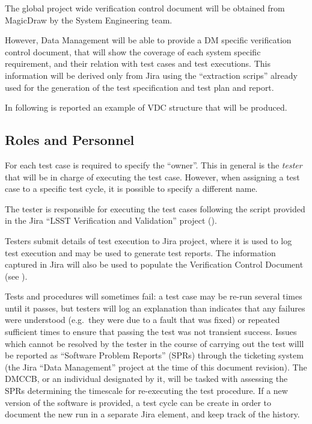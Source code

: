 The global project wide verification control document will be obtained from MagicDraw by the System Engineering team.

However, Data Management will be able to provide a DM specific verification control document, that will show the coverage of each system specific requirement, and their relation with test cases and test executions.
This information will be derived only from Jira using the ``extraction scrips'' already used for the generation of the test specification and test plan and report.

In following  is reported an example of VDC structure that will be produced.



\subsection{Roles and Personnel}
\label{sect:roles}


For each test case is required to specify the ``owner''. 
This in general is the \emph{tester} that will be in charge of executing the test case.
However, when assigning a test case to a specific test cycle, it is possible to specify a different name.

The tester is responsible for executing the test cases following the script provided in the Jira ``LSST Verification and Validation'' project ().

Testers submit details of test execution to Jira project, where it is used to log test execution and may be used to generate test reports.
The information captured in Jira will also be used to populate the Verification Control Document (see ).

Tests and procedures will sometimes fail: a test case may be re-run several times until it passes, but testers will log an explanation than indicates that any failures were understood (e.g.\ they were due to a fault that was fixed) or repeated sufficient times to ensure that passing the test was not transient success.
Issues which cannot be resolved by the tester in the course of carrying out the test willl be reported as ``Software Problem Reports'' (SPRs) through the \product{} ticketing system (the Jira ``Data Management'' project at the time of this document revision).
The DMCCB, or an individual designated by it, will be tasked with assessing the SPRs determining the timescale for re-executing the test procedure.
If a new version of the software is provided, a test cycle can be create in order to document the new run in a separate Jira element, and keep track of the history.

